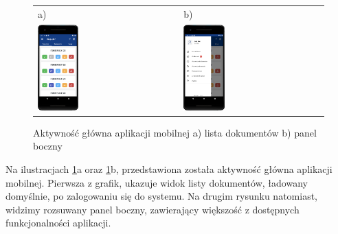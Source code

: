 \begin{figure}[ht]
  \centering
	\begin{tabular}{@{}ll@{}}
	a) & b) \\
  \includegraphics[width=0.3\textwidth]{rys04/mobilna/zrzut1} & 
	\includegraphics[width=0.3\textwidth]{rys04/mobilna/zrzut2}
	\end{tabular}
  \caption{Aktywność główna aplikacji mobilnej a) lista dokumentów b) panel boczny}
  \label{fig:gui-mobilna-zrzut12}
\end{figure}

Na ilustracjach \ref{fig:gui-mobilna-zrzut12}a oraz \ref{fig:gui-mobilna-zrzut12}b, przedstawiona została aktywność główna aplikacji mobilnej. Pierwsza z grafik, ukazuje widok listy dokumentów, ładowany domyślnie, po zalogowaniu się do systemu. Na drugim rysunku natomiast, widzimy rozsuwany panel boczny, zawierający większość z dostępnych funkcjonalności aplikacji.

